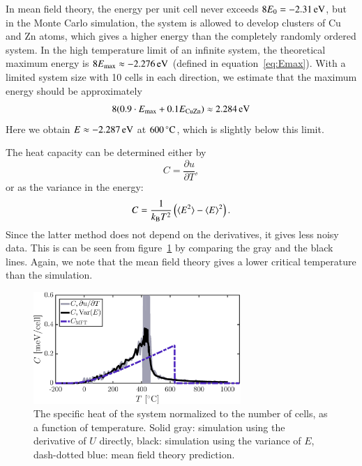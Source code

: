 In mean field theory, the energy per unit cell never exceeds $8 E_0 = \unit[-2.31]{eV}$, but in the Monte Carlo simulation, the system is allowed to develop clusters of Cu and Zn atoms, which gives a higher energy than the completely randomly ordered system. In the high temperature limit of an infinite system, the theoretical maximum energy is $ 8 E_{\rm max} \approx \unit[-2.276]{eV}$ (defined in equation~\eqref{eq:Emax}). With a limited system size with 10 cells in each direction, we estimate that the maximum energy should be approximately 
\begin{equation}
8 (0.9\cdot E_{\rm max} + 0.1 E_{\rm CuZn}) \approx \unit[2.284]{eV}
\end{equation}
Here we obtain $E \approx \unit[-2.287]{eV}$ at $\unit[600]{^\circ C}$, which is slightly below this limit. 

The heat capacity can be determined either by 
\begin{equation}
C = \frac{\partial u}{\partial T},
\label{eq:C1}
\end{equation}
or as the variance in the energy:
\begin{equation}
C = \frac{1}{k_{\rm B} T^2}\left(\langle E^2 \rangle  - \langle E \rangle^2 \right)
\label{eq:C2}.
\end{equation}
Since the latter method does not depend on the derivatives, it gives less noisy data. This is can be seen from figure~\ref{fig:C} by comparing the gray and the black lines. Again, we note that the mean field theory gives a lower critical temperature than the simulation. 

\begin{figure}[!ht]
\begin{center}
  \includegraphics[width=0.7\textwidth]{../figures/C} 
  \caption{The specific heat of the system normalized to the number of cells, as a function of temperature. Solid gray: simulation using the derivative of $U$ directly, black: simulation using the variance of $E$, dash-dotted blue: mean field theory prediction.}
  \label{fig:C}
\end{center}
\end{figure}

